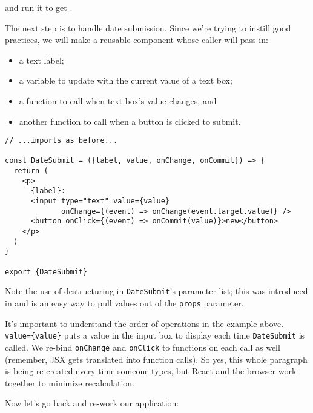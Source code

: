 \noindent
and run it to get .


The next step is to handle date submission.
Since we're trying to instill good practices,
we will make a reusable component whose caller will pass in:

\begin{itemize}
\item
  a text label;
\item
  a variable to update with the current value of a text box;
\item
  a function to call when text box's value changes, and
\item
  another function to call when a button is clicked to submit.
\end{itemize}

\begin{verbatim}
// ...imports as before...

const DateSubmit = ({label, value, onChange, onCommit}) => {
  return (
    <p>
      {label}:
      <input type="text" value={value}
             onChange={(event) => onChange(event.target.value)} />
      <button onClick={(event) => onCommit(value)}>new</button>
    </p>
  )
}

export {DateSubmit}
\end{verbatim}

Note the use of destructuring in \texttt{DateSubmit}'s parameter list;
this was introduced in 
and is an easy way to pull values out of the \texttt{props} parameter.

It's important to understand the order of operations in the example above.
\texttt{value=\{value\}} puts a value in the input box to display each time \texttt{DateSubmit} is called.
We re-bind \texttt{onChange} and \texttt{onClick} to functions on each call as well
(remember, JSX gets translated into function calls).
So yes,
this whole paragraph is being re-created every time someone types,
but React and the browser work together to minimize recalculation.

Now let's go back and re-work our application:

